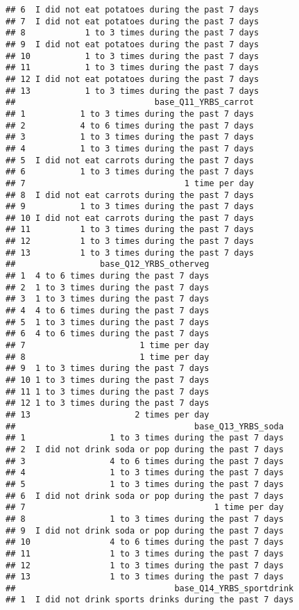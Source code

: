 \documentclass[]{article}
\begin{document}
\begin{verbatim}
## 6  I did not eat potatoes during the past 7 days
## 7  I did not eat potatoes during the past 7 days
## 8            1 to 3 times during the past 7 days
## 9  I did not eat potatoes during the past 7 days
## 10           1 to 3 times during the past 7 days
## 11           1 to 3 times during the past 7 days
## 12 I did not eat potatoes during the past 7 days
## 13           1 to 3 times during the past 7 days
##                            base_Q11_YRBS_carrot
## 1           1 to 3 times during the past 7 days
## 2           4 to 6 times during the past 7 days
## 3           1 to 3 times during the past 7 days
## 4           1 to 3 times during the past 7 days
## 5  I did not eat carrots during the past 7 days
## 6           1 to 3 times during the past 7 days
## 7                                1 time per day
## 8  I did not eat carrots during the past 7 days
## 9           1 to 3 times during the past 7 days
## 10 I did not eat carrots during the past 7 days
## 11          1 to 3 times during the past 7 days
## 12          1 to 3 times during the past 7 days
## 13          1 to 3 times during the past 7 days
##                 base_Q12_YRBS_otherveg
## 1  4 to 6 times during the past 7 days
## 2  1 to 3 times during the past 7 days
## 3  1 to 3 times during the past 7 days
## 4  4 to 6 times during the past 7 days
## 5  1 to 3 times during the past 7 days
## 6  4 to 6 times during the past 7 days
## 7                       1 time per day
## 8                       1 time per day
## 9  1 to 3 times during the past 7 days
## 10 1 to 3 times during the past 7 days
## 11 1 to 3 times during the past 7 days
## 12 1 to 3 times during the past 7 days
## 13                     2 times per day
##                                    base_Q13_YRBS_soda
## 1                 1 to 3 times during the past 7 days
## 2  I did not drink soda or pop during the past 7 days
## 3                 4 to 6 times during the past 7 days
## 4                 1 to 3 times during the past 7 days
## 5                 1 to 3 times during the past 7 days
## 6  I did not drink soda or pop during the past 7 days
## 7                                      1 time per day
## 8                 1 to 3 times during the past 7 days
## 9  I did not drink soda or pop during the past 7 days
## 10                4 to 6 times during the past 7 days
## 11                1 to 3 times during the past 7 days
## 12                1 to 3 times during the past 7 days
## 13                1 to 3 times during the past 7 days
##                                base_Q14_YRBS_sportdrink
## 1  I did not drink sports drinks during the past 7 days

\end{verbatim}
\end{document}
